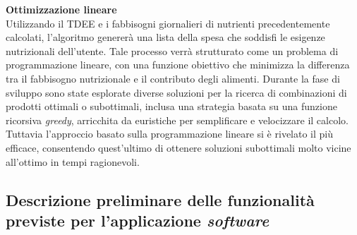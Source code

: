 \documentclass[11pt,a4paper]{article}
\begin{document}
\bigskip
\textbf{Ottimizzazione lineare}\\
Utilizzando il TDEE e i fabbisogni giornalieri di nutrienti precedentemente calcolati, l’algoritmo genererà una lista della spesa che soddisfi le esigenze nutrizionali dell’utente. Tale processo verrà strutturato come un problema di programmazione lineare, con una funzione obiettivo che minimizza la differenza tra il fabbisogno nutrizionale e il contributo degli alimenti. Durante la fase di sviluppo sono state esplorate diverse soluzioni per la ricerca di combinazioni di prodotti ottimali o subottimali, inclusa una strategia basata su una funzione ricorsiva \textit{greedy}, arricchita da euristiche per semplificare e velocizzare il calcolo. Tuttavia l’approccio basato sulla programmazione lineare si è rivelato il più efficace, consentendo quest'ultimo di ottenere soluzioni subottimali molto vicine all’ottimo in tempi ragionevoli.

\subsection{Descrizione preliminare delle funzionalità previste per l’applicazione \textit{software}}
\end{document}

